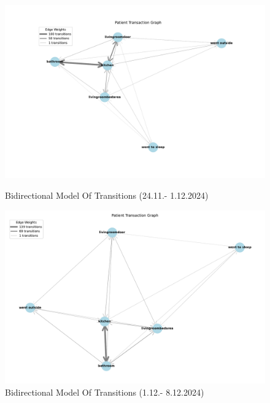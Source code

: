 \documentclass[A4,10pt]{article}
\begin{document}
\begin{figure}[H]
	\centering
	\begin{minipage}{0.45\textwidth}
		\centering
		\includegraphics[width=\textwidth]{biderictional_model1.pdf}
		\caption{Bidirectional Model Of Transitions (24.11.- 1.12.2024)}
		\label{fig:model1}
	\end{minipage}\hspace{0.04\textwidth}
	\begin{minipage}{0.45\textwidth}
		\centering
		\includegraphics[width=\textwidth]{biderictional_model2.pdf}
		\caption{Bidirectional Model Of Transitions (1.12.- 8.12.2024)}
		\label{fig:model2}
	\end{minipage}
\end{figure}
\end{document}
